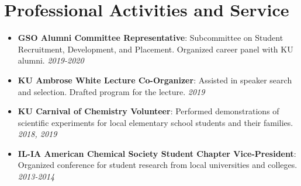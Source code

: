 \documentclass[a4paper,20pt]{article}
\newcommand{\resumeItem}[2]{
  \item\small{
    \textbf{#1}{: #2 \vspace{-2pt}}
  }
}
\newcommand{\resumeSubItem}[2]{\resumeItem{#1}{#2}\vspace{-3pt}}
\newcommand{\resumeSubHeadingListStart}{\begin{itemize}[leftmargin=*]}
\newcommand{\resumeSubHeadingListEnd}{\end{itemize}}
\begin{document}
\section{Professional Activities and Service}
  \resumeSubHeadingListStart
	\resumeSubItem{GSO Alumni Committee Representative}
    {Subcommittee on Student Recruitment, Development, and Placement. Organized career panel with KU alumni. \textit{2019-2020}}
    \resumeSubItem{KU Ambrose White Lecture Co-Organizer}
    {Assisted in speaker search and selection. Drafted program for the lecture. \textit{2019}}
    \resumeSubItem{KU Carnival of Chemistry Volunteer}
    {Performed demonstrations of scientific experiments for local elementary school students and their families. \textit{2018, 2019}}
    \resumeSubItem{IL-IA American Chemical Society Student Chapter Vice-President}{Organized conference for student research from local universities and colleges. \textit{2013-2014}} 

\resumeSubHeadingListEnd
\end{document}
